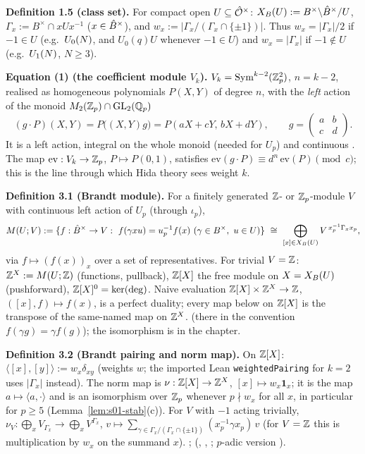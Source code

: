 \noindent{}\label{rpt:def:s01-classset}\textbf{Definition 1.5 (class set).}
For compact open $U\subseteq\hat{\mathcal{O}}^\times$: $X_B(U):=B^\times\backslash\hat{B}^\times/U$,
$\Gamma_x:=B^\times\cap xUx^{-1}$ ($x\in\hat{B}^\times$), and $w_x:=|\Gamma_x/(\Gamma_x\cap\{\pm1\})|$.
Thus $w_x=|\Gamma_x|/2$ if $-1\in U$ (e.g.\ $U_0(N)$, and $U_0(q)U$ whenever $-1\in U$) and $w_x=|\Gamma_x|$ if $-1\notin U$
(e.g.\ $U_1(N)$, $N\ge3$).

\medskip
\noindent{}\label{rpt:eq:s01-Vk}\textbf{Equation (1) (the coefficient module $V_k$).}
$V_k=\mathrm{Sym}^{k-2}(\mathbb{Z}_p^2)$, $n=k-2$, realised as homogeneous polynomials $P(X,Y)$ of degree $n$, with the \emph{left} action of the monoid
$M_2(\mathbb{Z}_p)\cap\mathrm{GL}_2(\mathbb{Q}_p)$
\[(g\cdot P)(X,Y)=P\big((X,Y)g\big)=P(aX+cY,\,bX+dY),\qquad g=\left(\begin{smallmatrix}a&b\\c&d\end{smallmatrix}\right).\tag{1}\]
It is a left action, integral on the whole monoid (needed for $U_p$) and continuous \stproved{}. The map $\mathrm{ev}:V_k\to\mathbb{Z}_p$,
$P\mapsto P(0,1)$, satisfies $\mathrm{ev}(g\cdot P)\equiv d^n\,\mathrm{ev}(P)\pmod{c}$; this is the line through which Hida theory sees weight $k$.

\medskip
\noindent{}\label{rpt:def:s01-brandt}\textbf{Definition 3.1 (Brandt module).}
For a finitely generated $\mathbb{Z}$- or $\mathbb{Z}_p$-module $V$ with continuous left action of $U_p$ (through $\iota_p$),
\[\Brandt{U}{V}:=\{f:\Bhat^\times\to V:\ f(\gamma xu)=u_p^{-1}f(x)\ (\gamma\in B^\times,\ u\in U)\}\ \cong\ \bigoplus_{[x]\in\XB{U}}V^{\,x_p^{-1}\Gamma_xx_p},\]
via $f\mapsto(f(x))_x$ over a set of representatives. For trivial $V=\mathbb{Z}$: $\mathbb{Z}^X:=M(U;\mathbb{Z})$ (functions, pullback),
$\mathbb{Z}[X]$ the free module on $X=X_B(U)$ (pushforward), $\mathbb{Z}[X]^0=\ker(\deg)$. Naive evaluation $\mathbb{Z}[X]\times\mathbb{Z}^X\to\mathbb{Z}$,
$([x],f)\mapsto f(x)$, is a perfect duality; every map below on $\mathbb{Z}[X]$ is the transpose of the same-named map on $\mathbb{Z}^X$.
\stknown{} \cite[(4.1)--(4.2) and Prop.~4.5, pp.~68--69]{Gr99} (there in the convention $f(\gamma g)=\gamma f(g)$); the isomorphism is
\stproved{} in the chapter.

\medskip
\noindent{}\label{rpt:def:s01-pairing}\textbf{Definition 3.2 (Brandt pairing and norm map).}
On $\mathbb{Z}[X]$: $\langle[x],[y]\rangle:=w_x\delta_{xy}$ (weights $w$; the imported Lean \texttt{weightedPairing} for $k=2$ uses $|\Gamma_x|$
instead). The norm map is $\nu:\mathbb{Z}[X]\to\mathbb{Z}^X$, $[x]\mapsto w_x\mathbf 1_x$; it is the map $a\mapsto\langle a,\cdot\rangle$ and is an
isomorphism over $\mathbb{Z}_p$ whenever $p\nmid w_x$ for all $x$, in particular for $p\ge5$ (Lemma~\ref{lem:s01-stab}(c)).
For $V$ with $-1$ acting trivially, $\nu_V:\bigoplus_xV_{\Gamma_x}\to\bigoplus_xV^{\Gamma_x}$,
$v\mapsto\sum_{\gamma\in\Gamma_x/(\Gamma_x\cap\{\pm1\})}(x_p^{-1}\gamma x_p)\,v$ (for $V=\mathbb{Z}$ this is multiplication by $w_x$ on the summand $x$).
\stproved{}; \stformal{} (, ,
; $p$-adic version ).

